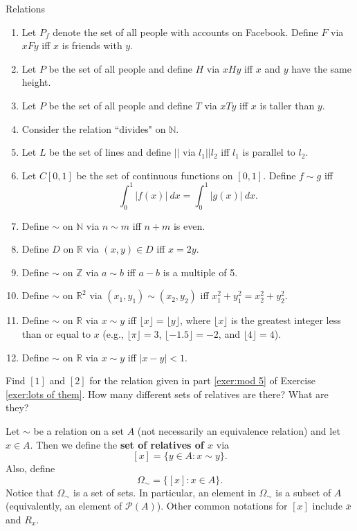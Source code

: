 \begin{section}{Relations}
\begin{exercise}
\begin{enumerate}\label{exer:lots of them}
\item\label{exer:facebook} Let \(P_f\) denote the set of all people with accounts on Facebook.  Define  \(F\) via \(xFy\) iff \(x\) is friends with \(y\). 
\item Let \(P\) be the set of all people and define \(H\) via \(xHy\) iff \(x\) and \(y\) have the same height.
\item Let \(P\) be the set of all people and define \(T\) via \(xTy\) iff \(x\) is taller than \(y\).
\item Consider the relation ``divides" on \(\mathbb{N}\).
\item Let \(L\) be the set of lines and define \(||\) via \(l_1||l_2\) iff \(l_1\) is parallel to \(l_2\).
\item Let \(C[0,1]\) be the set of continuous functions on \([0,1]\).  Define \(f\sim g\) iff
\[
\int_0^1|f(x)|\ dx=\int_0^1|g(x)|\ dx.
\]
\item Define \(\sim\) on \(\mathbb{N}\) via \(n\sim m\) iff \(n+m\) is even.
\item Define \(D\) on \(\mathbb{R}\) via \((x,y)\in D\) iff \(x=2y\).
\item\label{exer:mod 5} Define \(\sim\) on \(\mathbb{Z}\) via \(a\sim b\) iff \(a-b\) is a multiple of 5.
\item Define \(\sim\) on \(\mathbb{R}^2\) via \((x_1,y_1)\sim (x_2,y_2)\) iff \(x_1^2+y_1^2=x_2^2+y_2^2\).
\item Define \(\sim\) on \(\mathbb{R}\) via \(x\sim y\) iff \(\lfloor x\rfloor =\lfloor y\rfloor\), where \(\lfloor x\rfloor\) is the greatest integer less than or equal to \(x\) (e.g., \(\lfloor \pi\rfloor=3\), \(\lfloor -1.5\rfloor=-2\), and \(\lfloor 4\rfloor=4\)).
\item Define \(\sim\) on \(\mathbb{R}\) via \(x \sim y\) iff \(|x-y|<1\).
\end{enumerate}
\end{exercise}

\begin{exercise}
Find \([1]\) and \([2]\) for the relation given in part \ref{exer:mod 5} of Exercise \ref{exer:lots of them}.  How many different sets of relatives are there?  What are they?
\end{exercise}

\begin{definition}
Let \(\sim\) be a relation on a set \(A\) (not necessarily an equivalence relation) and let \(x\in A\).  Then we define the \textbf{set of relatives of \(x\)} via
\[
[x]=\{y\in A: x\sim y\}.
\]
Also, define
\[
\Omega_{\sim}=\{[x]:x\in A\}.
\]
Notice that \(\Omega_{\sim}\) is a set of sets.  In particular, an element in \(\Omega_{\sim}\) is a subset of \(A\) (equivalently, an element of \(\mathcal{P}(A)\)).  Other common notations for \([x]\) include \(\overline{x}\) and \(R_x\).
\end{definition}


\end{section}
